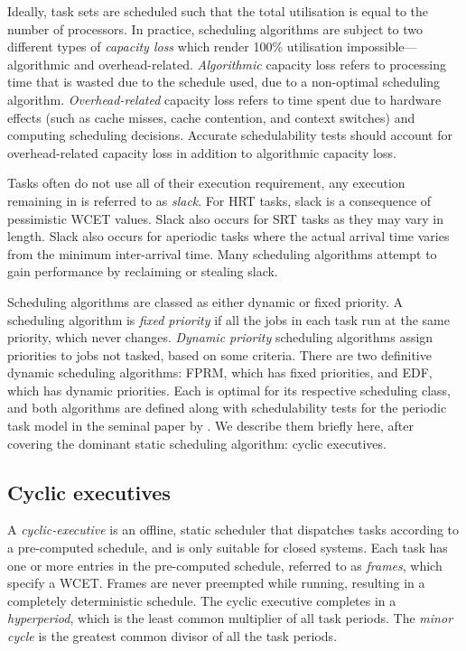 Ideally, task sets are scheduled such that the total utilisation is equal to the number of
processors.  In practice, scheduling algorithms are subject to two different types of \emph{capacity
loss} which render 100\% utilisation impossible---algorithmic and overhead-related.
\emph{Algorithmic} capacity loss refers to processing time that is wasted due to the schedule used,
due to a non-optimal scheduling algorithm.  \emph{Overhead-related} capacity loss refers to time
spent due to hardware effects (such as cache misses, cache contention, and context switches) and
computing scheduling decisions.  Accurate schedulability tests should account for overhead-related
capacity loss in addition to algorithmic capacity loss.

Tasks often do not use all of their execution requirement, any execution remaining in is referred to
as \emph{slack}. For \gls{HRT} tasks, slack is a consequence of pessimistic \gls{WCET} values. Slack
also occurs for \gls{SRT} tasks as they may vary in length. Slack also occurs for aperiodic
tasks where the actual arrival time varies from the minimum inter-arrival time. Many scheduling algorithms
attempt to gain performance by reclaiming or stealing slack.

Scheduling algorithms are classed as either dynamic or fixed priority. A scheduling algorithm 
is \emph{fixed priority} if all the jobs in each task run at the same priority, which never changes. 
\emph{Dynamic priority} scheduling algorithms assign priorities to jobs not tasked, based on some criteria. 
There are two definitive dynamic scheduling  algorithms: \gls{FPRM}, which has fixed priorities, and
\gls{EDF}, which has dynamic priorities. Each is optimal for its respective scheduling class,  and both algorithms are defined along with
schedulability tests for the periodic task model in the seminal paper by \citet{Liu_Layland_73}. We
describe them briefly here, after covering the dominant static scheduling algorithm: cyclic
executives. 

\subsection{Cyclic executives}
\label{s:cyclic-executive}

A \emph{cyclic-executive} is an offline, static scheduler that dispatches tasks according to a pre-computed schedule, and is only
suitable for closed systems. Each task
has one or more entries in the pre-computed schedule, referred to as \emph{frames}, which specify a
\gls{WCET}. Frames are never preempted while running, resulting in a completely deterministic
schedule. The cyclic executive completes in a
\emph{hyperperiod}, which is the least common multiplier of all task periods. The \emph{minor cycle}
is the greatest common divisor of all the task periods.

